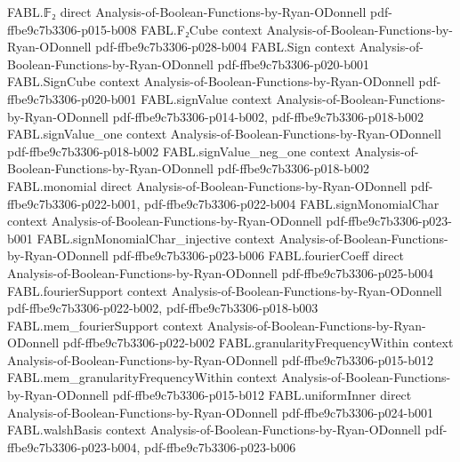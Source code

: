 \begin{theorem}
\label{FABL.boolPrefixParity_full}
\leanok
{}
\proofstep
  {FABL.𝔽₂}
  {direct}
  {Analysis-of-Boolean-Functions-by-Ryan-ODonnell}
  {pdf-ffbe9c7b3306-p015-b008}
\proofstep
  {FABL.F₂Cube}
  {context}
  {Analysis-of-Boolean-Functions-by-Ryan-ODonnell}
  {pdf-ffbe9c7b3306-p028-b004}
\proofstep
  {FABL.Sign}
  {context}
  {Analysis-of-Boolean-Functions-by-Ryan-ODonnell}
  {pdf-ffbe9c7b3306-p020-b001}
\proofstep
  {FABL.SignCube}
  {context}
  {Analysis-of-Boolean-Functions-by-Ryan-ODonnell}
  {pdf-ffbe9c7b3306-p020-b001}
\proofstep
  {FABL.signValue}
  {context}
  {Analysis-of-Boolean-Functions-by-Ryan-ODonnell}
  {pdf-ffbe9c7b3306-p014-b002,
    pdf-ffbe9c7b3306-p018-b002}
\proofstep
  {FABL.signValue_one}
  {context}
  {Analysis-of-Boolean-Functions-by-Ryan-ODonnell}
  {pdf-ffbe9c7b3306-p018-b002}
\proofstep
  {FABL.signValue_neg_one}
  {context}
  {Analysis-of-Boolean-Functions-by-Ryan-ODonnell}
  {pdf-ffbe9c7b3306-p018-b002}
\proofstep
  {FABL.monomial}
  {direct}
  {Analysis-of-Boolean-Functions-by-Ryan-ODonnell}
  {pdf-ffbe9c7b3306-p022-b001,
    pdf-ffbe9c7b3306-p022-b004}
\proofstep
  {FABL.signMonomialChar}
  {context}
  {Analysis-of-Boolean-Functions-by-Ryan-ODonnell}
  {pdf-ffbe9c7b3306-p023-b001}
\proofstep
  {FABL.signMonomialChar_injective}
  {context}
  {Analysis-of-Boolean-Functions-by-Ryan-ODonnell}
  {pdf-ffbe9c7b3306-p023-b006}
\proofstep
  {FABL.fourierCoeff}
  {direct}
  {Analysis-of-Boolean-Functions-by-Ryan-ODonnell}
  {pdf-ffbe9c7b3306-p025-b004}
\proofstep
  {FABL.fourierSupport}
  {context}
  {Analysis-of-Boolean-Functions-by-Ryan-ODonnell}
  {pdf-ffbe9c7b3306-p022-b002,
    pdf-ffbe9c7b3306-p018-b003}
\proofstep
  {FABL.mem_fourierSupport}
  {context}
  {Analysis-of-Boolean-Functions-by-Ryan-ODonnell}
  {pdf-ffbe9c7b3306-p022-b002}
\proofstep
  {FABL.granularityFrequencyWithin}
  {context}
  {Analysis-of-Boolean-Functions-by-Ryan-ODonnell}
  {pdf-ffbe9c7b3306-p015-b012}
\proofstep
  {FABL.mem_granularityFrequencyWithin}
  {context}
  {Analysis-of-Boolean-Functions-by-Ryan-ODonnell}
  {pdf-ffbe9c7b3306-p015-b012}
\proofstep
  {FABL.uniformInner}
  {direct}
  {Analysis-of-Boolean-Functions-by-Ryan-ODonnell}
  {pdf-ffbe9c7b3306-p024-b001}
\proofstep
  {FABL.walshBasis}
  {context}
  {Analysis-of-Boolean-Functions-by-Ryan-ODonnell}
  {pdf-ffbe9c7b3306-p023-b004,
    pdf-ffbe9c7b3306-p023-b006}

\end{theorem}
